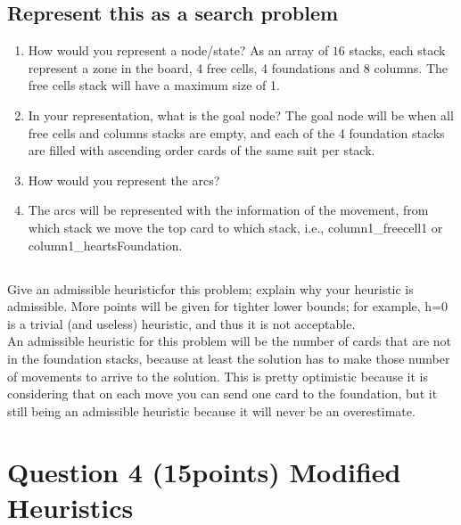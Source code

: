 \documentclass{article}
\def\ans#1{{\color{ans}#1}}
\begin{document}
\subsection{Represent this as a search problem}
\begin{enumerate}[label=(\alph*)]
    \item How would you represent a node/state?
    \ans{
        As an array of $16$ stacks, each stack represent a zone in the board, 4 free cells, 4 foundations 
        and 8 columns. The free cells stack will have a maximum size of 1.
    }
    \item In your representation, what is the goal node?
    \ans{
        The goal node will be when all free cells and columns stacks are empty, and each of the 4 foundation 
        stacks are filled with ascending order cards of the same suit per stack.
    }
    \item How would you represent the arcs?
    \item \ans{
        The arcs will be represented with the information of the movement, from which stack we move the 
        top card to which stack, i.e., column1\_freecell1 or column1\_heartsFoundation.
    }
\end{enumerate}

\subsection{}
Give  an  admissible  heuristicfor  this  problem;  explain  why  your  heuristic  is  admissible. More points will be given for tighter lower bounds; for example, h=0 is a trivial (and useless) heuristic, and thus it is not acceptable. \\
\ans{
    An admissible heuristic for this problem will be the number of cards that are not in the foundation 
    stacks, because at least the solution has to make those number of movements to arrive to the solution.
    This is pretty optimistic because it is considering that on each move you can send one card to the 
    foundation, but it still being an admissible heuristic because it will never be an overestimate.
}



\clearpage
\section{Question 4 (15points) Modified Heuristics}
\end{document}
